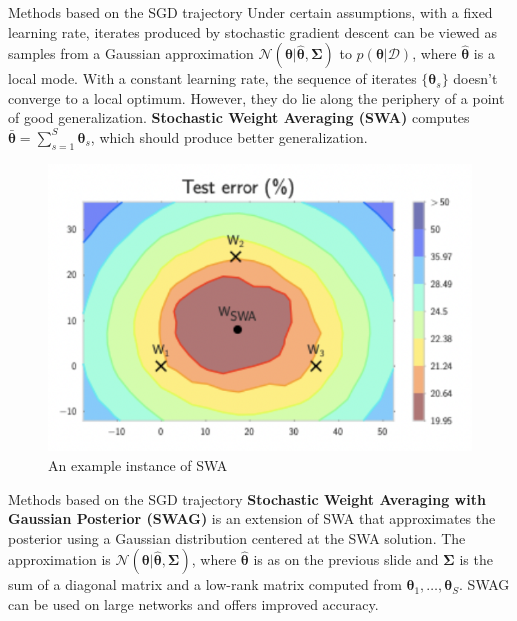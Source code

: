 \documentclass{beamer}
\begin{document}
\begin{frame}{Methods based on the SGD trajectory}
    Under certain assumptions, with a fixed learning rate, iterates produced by stochastic gradient descent can be viewed as samples from a Gaussian approximation $\mathcal{N}(\boldsymbol{\theta} | \hat{\boldsymbol{\theta}}, \boldsymbol{\Sigma})$ to $p(\boldsymbol{\theta} | \mathcal{D})$, where $\hat{\boldsymbol{\theta}}$ is a local mode. With a constant learning rate, the sequence of iterates $\{\boldsymbol{\theta}_s\}$ doesn't converge to a local optimum. However, they do lie along the periphery of a point of good generalization. \textbf{Stochastic Weight Averaging (SWA)} computes $\bar{\boldsymbol{\theta}} = \sum_{s = 1}^S \boldsymbol{\theta}_s$, which should produce better generalization.
    
    \begin{figure}
        \centering
        \includegraphics[scale=0.5]{stochastic_weight_averaging}
        \caption{An example instance of SWA}
        \label{fig:stochastic_weight_averaging}
    \end{figure}
\end{frame}

\begin{frame}{Methods based on the SGD trajectory}
    \textbf{Stochastic Weight Averaging with Gaussian Posterior (SWAG)} is an extension of SWA that approximates the posterior using a Gaussian distribution centered at the SWA solution. The approximation is $\mathcal{N}(\boldsymbol{\theta} | \hat{\boldsymbol{\theta}}, \boldsymbol{\Sigma})$, where $\hat{\boldsymbol{\theta}}$ is as on the previous slide and $\boldsymbol{\Sigma}$ is the sum of a diagonal matrix and a low-rank matrix computed from $\boldsymbol{\theta}_1, \ldots, \boldsymbol{\theta}_S$. SWAG can be used on large networks and offers improved accuracy.
\end{frame}
\end{document}
